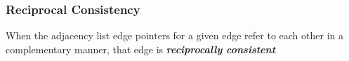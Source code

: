 \begin{frame}
  \frametitle{Reciprocal Consistency}
  \centering
  When the adjacency list edge pointers for a given edge refer to each other in a complementary manner, that edge is \textbf{\emph{reciprocally consistent}}
\end{frame}